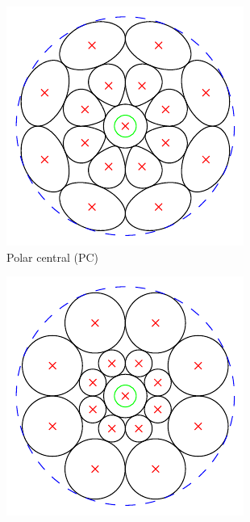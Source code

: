 \documentclass[thesis.tex]{subfiles}
\begin{document}
\begin{figure}[p]
\begin{subfigure}[t]{0.32\textwidth}
		\includegraphics[width=\textwidth]{img/gridType_polar_central_polar_gaussian.pdf}
		\caption{Polar central (PC)}
		\label{fig:gridTypePc}
	\end{subfigure}
	\begin{subfigure}[t]{0.32\textwidth}
		\includegraphics[width=\textwidth]{img/gridType_log-polar.pdf}

\end{subfigure}
\end{figure}
\end{document}

